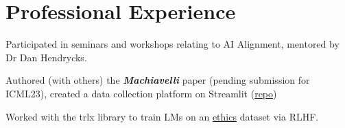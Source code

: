 \documentclass[]{deedy-resume-openfont}
\begin{document}
\begin{minipage}[t]{0.66\textwidth} 


\section{Professional Experience}
\vspace{\topsep} %
\begin{tightemize}
\item Participated in seminars and workshops relating to AI Alignment, mentored by Dr Dan Hendrycks.
\item Authored (with others) the \emph{\textbf{Machiavelli}}
paper (pending submission for ICML23), created a data collection platform on Streamlit (\href{https://github.com/derpyplops/cyoa-streamlit}{repo})
\item Worked with the trlx library to train LMs on an \href{https://github.com/hendrycks/ethics}{ethics} dataset via RLHF.


\end{tightemize}
\end{minipage}
\end{document}
